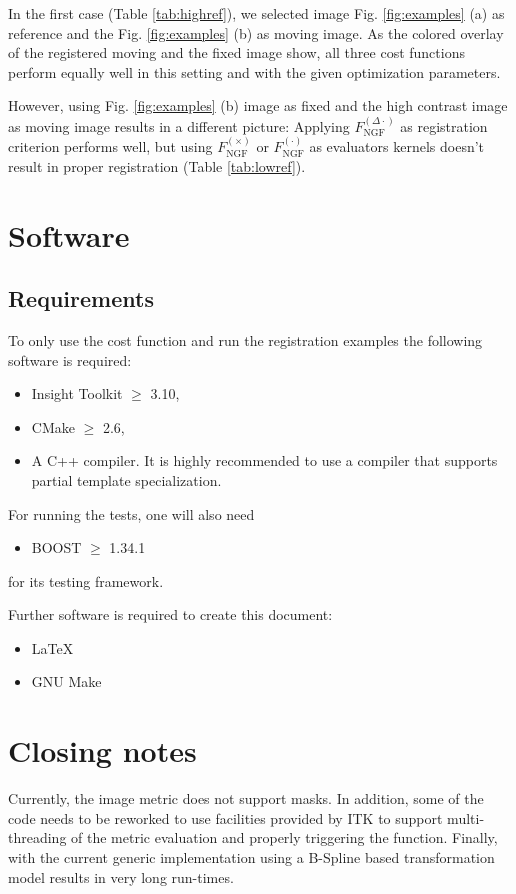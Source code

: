 \documentclass{InsightArticle}
\newcommand{\Fcs}{\ensuremath{{F_{\text{NGF}}^{(\cdot)}}} } %
\newcommand{\Fcc}{\ensuremath{{F_{\text{NGF}}^{(\times)}}} } %
\newcommand{\Fcd}{\ensuremath{{F_{\text{NGF}}^{(\Delta\cdot)}}} } %
\begin{document}
In the first case (Table \ref{tab:highref}), we selected image Fig. \ref{fig:examples} (a) 
  as reference and the  Fig. \ref{fig:examples} (b) as moving image. 
As the colored overlay of the registered moving and the fixed image show, 
  all three cost functions perform equally well in this setting and with the given optimization parameters.

However, using Fig. \ref{fig:examples} (b) image as fixed and the high contrast image as moving image 
  results in a different picture: 
Applying \Fcd as registration criterion performs well, but using  
  \Fcc or \Fcs as evaluators kernels doesn't result in proper registration (Table \ref{tab:lowref}). 

\section{Software}

\subsection{Requirements}
To only use the cost function and run the registration examples the following software is required:
\begin{itemize}
  \item  Insight Toolkit $\ge$ 3.10, 
  \item  CMake $\ge$ 2.6, 
  \item  A C++ compiler. It is highly recommended to use a compiler that supports partial 
    template specialization.
\end{itemize}

For running the tests, one will also need 
\begin{itemize}
\item  BOOST $\ge$ 1.34.1
\end{itemize}
for its testing framework. 

Further software is required to create this document:
\begin{itemize}
\item LaTeX 
\item GNU Make 
\end{itemize}

\section{Closing notes}

Currently, the image metric does not support masks. 
In addition, some of the code needs to be reworked to use facilities provided by ITK to support 
  multi-threading of the metric evaluation and properly triggering the  function.
Finally, with the current generic implementation using a B-Spline based transformation 
  model results in very long run-times.
\end{document}
